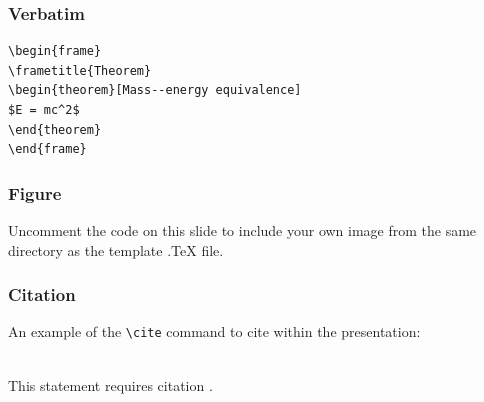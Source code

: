 \documentclass{beamer}
\begin{document}

\begin{frame}[fragile] %
\frametitle{Verbatim}
\begin{example}
\begin{verbatim}
\begin{frame}
\frametitle{Theorem}
\begin{theorem}[Mass--energy equivalence]
$E = mc^2$
\end{theorem}
\end{frame}\end{verbatim}
\end{example}
\end{frame}


\begin{frame}
\frametitle{Figure}
Uncomment the code on this slide to include your own image from the same directory as the template .TeX file.
\end{frame}


\begin{frame}[fragile] %
\frametitle{Citation}
An example of the \verb|\cite| command to cite within the presentation:\\~

This statement requires citation \cite{p1}.
\end{frame}

\end{document}
